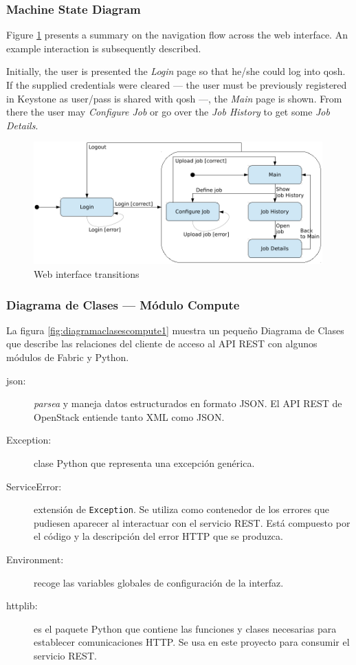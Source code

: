 \subsubsection{Machine State Diagram}\label{subsubsec:navegacion}
\noindent Figure \ref{fig:navegacion} presents a summary on the navigation flow across the web interface. An example interaction is subsequently described.

Initially, the user is presented the \emph{Login} page so that he/she could log into qosh. If the supplied credentials were cleared --- the user must be previously registered in Keystone as user/pass is shared with qosh ---, the \emph{Main} page is shown. From there the user may \emph{Configure Job} or go over the \emph{Job History} to get some \emph{Job Details}.

\begin{figure}[tbp]
\begin{center}
\includegraphics[width=0.99\textwidth]{imagenes/026.pdf}
 \caption{Web interface transitions}
\label{fig:navegacion}
\end{center}
\end{figure}

\subsubsection{Diagrama de Clases --- M\'odulo Compute}\label{subsubsec:diagramaclasescompute}
\noindent La figura \ref{fig:diagramaclasescompute1} muestra un peque\~no Diagrama de Clases que describe las relaciones del cliente de acceso al API REST con algunos m\'odulos de Fabric y Python.

\begin{description}
 \item[json:] \emph{parsea} y maneja datos estructurados en formato JSON. El API REST de OpenStack entiende tanto XML como JSON.
 \item[Exception:] clase Python que representa una excepci\'on gen\'erica.
 \item[ServiceError:] extensi\'on de \texttt{Exception}. Se utiliza como contenedor de los errores que pudiesen aparecer al interactuar con el servicio REST. Est\'a compuesto por el c\'odigo y la descripci\'on del error HTTP que se produzca.
 \item[Environment:] recoge las variables globales de configuraci\'on de la interfaz.
 \item[httplib:] es el paquete Python que contiene las funciones y clases necesarias para establecer comunicaciones HTTP. Se usa en este proyecto para consumir el servicio REST.
\end{description}

